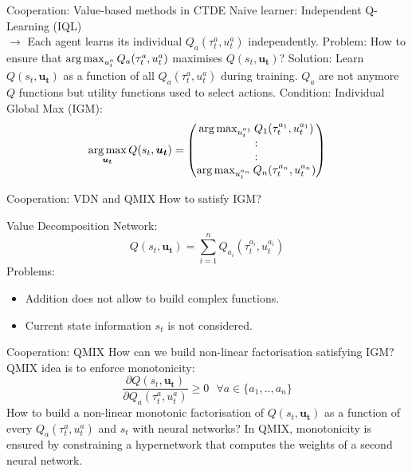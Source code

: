 \documentclass[9pt, hyperref={pdfusetitle,colorlinks=true,allcolors=DarkBlue}]{beamer}
\begin{document}
\begin{frame}{Cooperation: Value-based methods in CTDE}
Naive learner: Independent Q-Learning (IQL)\\
$\rightarrow$ Each agent learns its individual $Q_a(\tau^a_t, u^a_t)$ independently.
\vfill
Problem:
How to ensure that $\operatorname*{arg\,max}_{u^a_t} Q_a(\tau^a_t, u^a_t)$ maximises $Q(s_t, \bm{u_t})$?
\vfill
\pause
Solution: Learn $Q(s_t, \bm{u_t})$ as a function of all $Q_a(\tau^a_t, u^a_t)$ during training.
\vfill
$Q_a$ are not anymore $Q$ functions but utility functions used to select actions.
\vfill
Condition: Individual Global Max (IGM):
\begin{equation*}
    \operatorname*{arg\,max}_{\bm{u_t}} Q(s_t, \bm{u_t}) = 
    \begin{pmatrix}
    \operatorname*{arg\,max}_{u^{a_1}_t} Q_1(\tau^{a_1}_t, u^{a_1}_t) \\
    : \\
    : \\
    \operatorname*{arg\,max}_{u^{a_n}_t} Q_n(\tau^{a_n}_t, u^{a_n}_t)
    \end{pmatrix}
\end{equation*}

\end{frame}



\begin{frame}{Cooperation: VDN and QMIX}
How to satisfy IGM?

Value Decomposition Network:
\begin{equation*}
    Q(s_t, \bm{u_t}) = \sum_{i=1}^n Q_{a_i}(\tau^{a_i}_t, u^{a_i}_t) 
\end{equation*}
Problems:
\begin{itemize}
    \item Addition does not allow to build complex functions.
    \item Current state information $s_t$ is not considered.
\end{itemize}
\end{frame}

\begin{frame}{Cooperation: QMIX}
How can we build non-linear factorisation satisfying IGM? 
\vfill
QMIX idea is to enforce monotonicity:
\begin{equation*}
    \frac{\partial Q(s_t, \bm{u_t})}{\partial Q_{a}(\tau^{a}_t, u_t^{a})} \geq 0 \text{ } \forall a \in \{a_1,..,a_n\}
\end{equation*}
\vfill
How to build a non-linear monotonic factorisation of $Q(s_t, \bm{u_t})$ as a function of every  $Q_a(\tau^{a}_t, u^a_t)$ and $s_t$ with neural networks?
\vfill
In QMIX, monotonicity is ensured by constraining a hypernetwork that computes the weights of a second neural network.
\end{frame}
\end{document}
